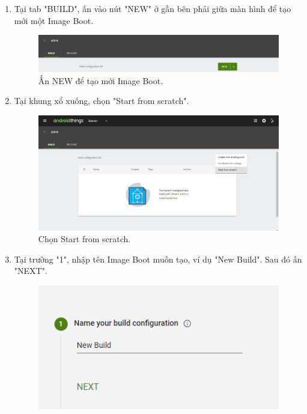 \begin{enumerate}
\item Tại tab "BUILD", ấn vào nút "NEW" ở gần bên phải giữa màn hình để tạo mới một Image Boot.
\begin{center}
\begin{figure}[!htp]
\begin{center}
\includegraphics[scale=0.4]{image3/sat6.png}
\end{center}
\caption{Ấn NEW để tạo mới Image Boot.}
\label{refhinh1}
\end{figure}
\end{center}
\newpage
\item Tại khung xổ xuống, chọn "Start from scratch".
\begin{center}
\begin{figure}[htp]
\begin{center}
\includegraphics[scale=0.38]{image3/sat7.png}
\end{center}
\caption{Chọn Start from scratch.}
\label{refhinh1}
\end{figure}
\end{center}
\item Tại trường "1", nhập tên Image Boot muốn tạo, ví dụ "New Build". Sau đó ấn "NEXT".
\begin{center}
\begin{figure}[htp]
\begin{center}
\includegraphics[scale=0.65]{image3/sat8.png}

\end{center}
\end{figure}
\end{center}
\end{enumerate}
